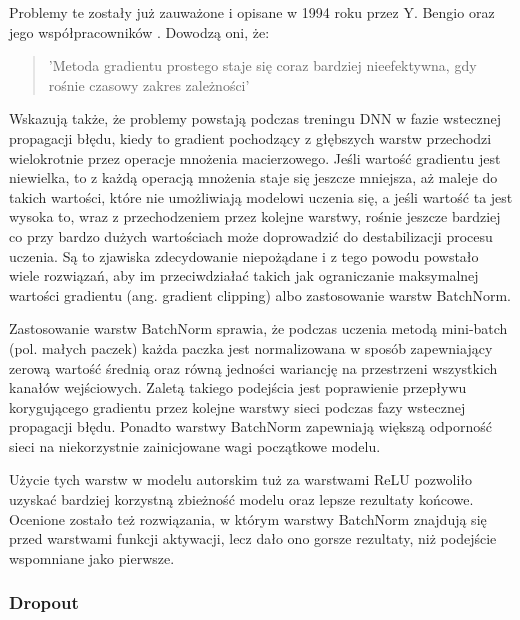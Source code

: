   \noindent
  Problemy te zostały już zauważone i opisane w 1994 roku przez Y. Bengio
  oraz jego współpracowników \cite{exploding_vanishing_grad}. Dowodzą oni, że:
  \begin{quote}
    'Metoda gradientu prostego staje się coraz bardziej nieefektywna, gdy
    rośnie czasowy zakres zależności'
  \end{quote}
  Wskazują także, że problemy powstają podczas treningu DNN w fazie wstecznej
  propagacji błędu, kiedy to gradient pochodzący z głębszych warstw przechodzi
  wielokrotnie przez operacje mnożenia macierzowego. Jeśli wartość gradientu
  jest niewielka, to z każdą operacją mnożenia staje się jeszcze mniejsza, aż
  maleje do takich wartości, które nie umożliwiają modelowi uczenia się, a jeśli
  wartość ta jest wysoka to, wraz z przechodzeniem przez kolejne warstwy, rośnie
  jeszcze bardziej co przy bardzo dużych wartościach może doprowadzić do
  destabilizacji procesu uczenia. Są to zjawiska zdecydowanie niepożądane i z
  tego powodu powstało wiele rozwiązań, aby im przeciwdziałać takich jak
  ograniczanie maksymalnej wartości gradientu (ang. gradient clipping) albo
  zastosowanie warstw BatchNorm.

  Zastosowanie warstw BatchNorm sprawia, że podczas uczenia metodą mini-batch
  (pol. małych paczek) każda paczka jest
  normalizowana w sposób zapewniający zerową wartość średnią oraz
  równą jedności wariancję na przestrzeni wszystkich kanałów wejściowych.
  Zaletą takiego podejścia jest poprawienie przepływu korygującego gradientu
  przez kolejne warstwy sieci podczas fazy wstecznej propagacji błędu. Ponadto
  warstwy BatchNorm zapewniają większą odporność sieci na niekorzystnie zainicjowane
  wagi początkowe modelu.

  Użycie tych warstw w modelu autorskim tuż za warstwami ReLU pozwoliło
  uzyskać bardziej korzystną zbieżność modelu oraz lepsze rezultaty końcowe.
  Ocenione zostało też rozwiązania, w którym warstwy BatchNorm znajdują się
  przed warstwami funkcji aktywacji, lecz dało ono gorsze rezultaty, niż
  podejście wspomniane jako pierwsze.

\subsubsection{Dropout} \label{Dropout}

